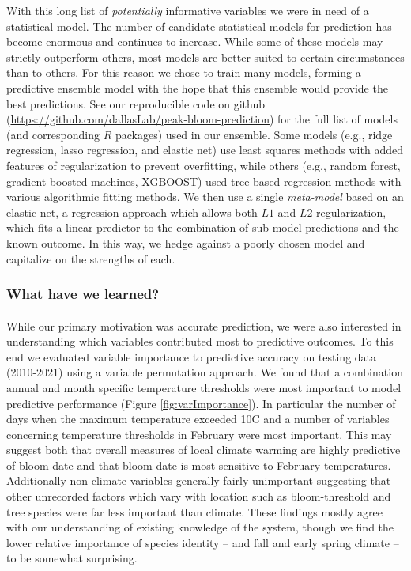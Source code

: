 \documentclass[a4paper,11pt]{article}
\begin{document}
With this long list of \textit{potentially} informative variables we were in need of a statistical model. The number of candidate statistical models for prediction has become enormous and continues to increase. While some of these models may strictly outperform others, most models are better suited to certain circumstances than to others. For this reason we chose to train many models, forming a predictive ensemble model with the hope that this ensemble would provide the best predictions. See our reproducible code on github (\url{https://github.com/dallasLab/peak-bloom-prediction}) for the full list of models (and corresponding $R$ packages) used in our ensemble. Some models (e.g., ridge regression, lasso regression, and elastic net) use least squares methods with added features of regularization to prevent overfitting, while others (e.g., random forest, gradient boosted machines, XGBOOST) used tree-based regression methods with various algorithmic fitting methods. We then use a single \textit{meta-model} based on an elastic net, a regression approach which allows both $L1$ and $L2$ regularization, which fits a linear predictor to the combination of sub-model predictions and the known outcome. In this way, we hedge against a poorly chosen model and capitalize on the strengths of each. 



\subsubsection{What have we learned?}

\paragraph*{}
While our primary motivation was accurate prediction, we were also interested in understanding which variables contributed most to predictive outcomes. To this end we evaluated variable importance to predictive accuracy on testing data (2010-2021) using a variable permutation approach. We found that a combination annual and month specific temperature thresholds were most important to model predictive performance (Figure \ref{fig:varImportance}). In particular the number of days when the maximum temperature exceeded 10\degree C and a number of variables concerning temperature thresholds in February were most important. This may suggest both that overall measures of local climate warming are highly predictive of bloom date and that bloom date is most sensitive to February temperatures. Additionally non-climate variables generally fairly unimportant suggesting that other unrecorded factors which vary with location such as bloom-threshold and tree species were far less important than climate. These findings mostly agree with our understanding of existing knowledge of the system, though we find the lower relative importance of species identity -- and fall and early spring climate -- to be somewhat surprising.
\end{document}
